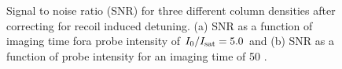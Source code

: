 \documentclass[12pt]{iopart}
\begin{document}
\begin{figure}
\caption{Signal to noise ratio (SNR) for three different column densities after correcting for recoil induced detuning. (a) SNR as a function of imaging time fora probe intensity of $I_0/I_{\rm{sat}}=5.0$ and (b) SNR as a function of probe intensity for an imaging time of 50 \us{}.}  
\label{fig:SNR}
\end{figure}
\end{document}

